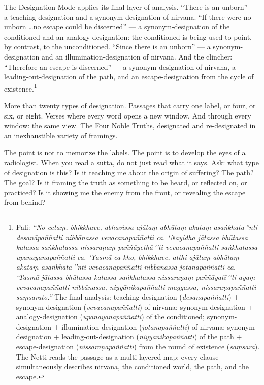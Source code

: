 The Designation Mode applies its final layer of analysis. ``There is an unborn'' --- a teaching-designation and a synonym-designation of nirvana. ``If there were no unborn \ldots no escape could be discerned'' --- a synonym-designation of the conditioned and an analogy-designation: the conditioned is being used to point, by contrast, to the unconditioned. ``Since there is an unborn'' --- a synonym-designation and an illumination-designation of nirvana. And the clincher: ``Therefore an escape is discerned'' --- a synonym-designation of nirvana, a leading-out-designation of the path, and an escape-designation from the cycle of existence.\footnote{Pali: \textit{``No cetaṃ, bhikkhave, abhavissa ajātaṃ abhūtaṃ akataṃ asaṅkhata\,''nti desanāpaññatti nibbānassa vevacanapaññatti ca. `Nayidha jātassa bhūtassa katassa saṅkhatassa nissaraṇaṃ paññāyethā\,''ti vevacanapaññatti saṅkhatassa upanayanapaññatti ca. `Yasmā ca kho, bhikkhave, atthi ajātaṃ abhūtaṃ akataṃ asaṅkhata\,''nti vevacanapaññatti nibbānassa jotanāpaññatti ca. `Tasmā jātassa bhūtassa katassa saṅkhatassa nissaraṇaṃ paññāyatī\,''ti ayaṃ vevacanapaññatti nibbānassa, niyyānikapaññatti maggassa, nissaraṇapaññatti saṃsārato.''} The final analysis: teaching-designation (\textit{desanāpaññatti}) + synonym-designation (\textit{vevacanapaññatti}) of nirvana; synonym-designation + analogy-designation (\textit{upanayanapaññatti}) of the conditioned; synonym-designation + illumination-designation (\textit{jotanāpaññatti}) of nirvana; synonym-designation + leading-out-designation (\textit{niyyānikapaññatti}) of the path + escape-designation (\textit{nissaraṇapaññatti}) from the round of existence (\textit{saṃsāra}). The Netti reads the passage as a multi-layered map: every clause simultaneously describes nirvana, the conditioned world, the path, and the escape.}

\ornament

More than twenty types of designation. Passages that carry one label, or four, or six, or eight. Verses where every word opens a new window. And through every window: the same view. The Four Noble Truths, designated and re-designated in an inexhaustible variety of framings.

The point is not to memorize the labels. The point is to develop the eyes of a radiologist. When you read a sutta, do not just read what it says. Ask: what type of designation is this? Is it teaching me about the origin of suffering? The path? The goal? Is it framing the truth as something to be heard, or reflected on, or practiced? Is it showing me the enemy from the front, or revealing the escape from behind?

